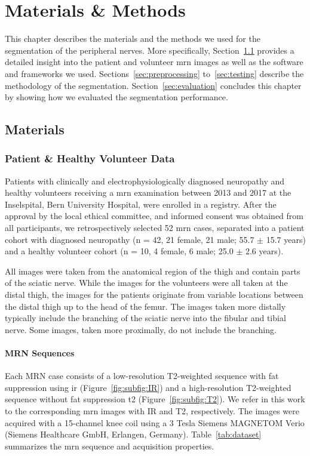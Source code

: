 \chapter{Materials \& Methods} \label{chap:methods}
This chapter describes the materials and the methods we used for the segmentation of the peripheral nerves. More specifically, Section~\ref{sec:materials} provides a detailed insight into the patient and volunteer \gls{mrn} images as well as the software and frameworks we used. Sections~\ref{sec:preprocessing} to~\ref{sec:testing} describe the methodology of the segmentation. Section~\ref{sec:evaluation} concludes this chapter by showing how we evaluated the segmentation performance.

\section{Materials} \label{sec:materials}

\subsection{Patient \& Healthy Volunteer Data}
Patients with clinically and electrophysiologically diagnosed neuropathy and healthy volunteers receiving a \gls{mrn} examination between 2013 and 2017 at the Inselspital, Bern University Hospital, were enrolled in a registry. After the approval by the local ethical committee, and informed consent was obtained from all participants, we retrospectively selected 52 \gls{mrn} cases, separated into a patient cohort with diagnosed neuropathy (n = 42, 21 female, 21 male; 55.7 $\pm$ 15.7 years) and a healthy volunteer cohort (n = 10, 4 female, 6 male; 25.0 $\pm$ 2.6 years).

All images were taken from the anatomical region of the thigh and contain parts of the sciatic nerve. While the images for the volunteers were all taken at the distal thigh, the images for the patients originate from variable locations between the distal thigh up to the head of the femur. The images taken more distally typically include the branching of the sciatic nerve into the fibular and tibial nerve. Some images, taken more proximally, do not include the branching.

\subsubsection{MRN Sequences} \label{dataset_mrn}
Each MRN case consists of a low-resolution T2-weighted sequence with fat suppression using \gls{ir} (Figure~\ref{fig:subfig:IR}) and a high-resolution T2-weighted sequence without fat suppression \gls{t2} (Figure~\ref{fig:subfig:T2}). We refer in this work to the corresponding \gls{mrn} images with IR and T2, respectively. The images were acquired with a 15-channel knee coil using a 3 Tesla Siemens MAGNETOM Verio (Siemens Healthcare GmbH, Erlangen, Germany). Table~\ref{tab:dataset} summarizes the \gls{mrn} sequence and acquisition properties.

